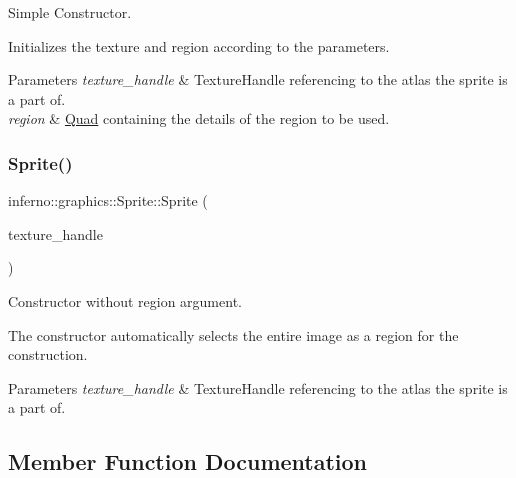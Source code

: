 Simple Constructor. 

Initializes the texture and region according to the parameters. 
\begin{DoxyParams}{Parameters}
{\em texture\+\_\+handle} & Texture\+Handle referencing to the atlas the sprite is a part of. \\
\hline
{\em region} & \mbox{\hyperlink{classinferno_1_1graphics_1_1_quad}{Quad}} containing the details of the region to be used. \\
\hline
\end{DoxyParams}
\mbox{\label{classinferno_1_1graphics_1_1_sprite_a8673ad1ca45d867e83355a1ad10b752a}} 
\subsubsection{\texorpdfstring{Sprite()}{Sprite()}\hspace{0.1cm}{\footnotesize\ttfamily [2/2]}}
{\footnotesize\ttfamily inferno\+::graphics\+::\+Sprite\+::\+Sprite (\begin{DoxyParamCaption}\item[{\mbox{\hyperlink{namespaceinferno_1_1graphics_a9d719bfbfedd17b9ace9b8d603ab5a38}{Texture\+Handle}}}]{texture\+\_\+handle }\end{DoxyParamCaption})\hspace{0.3cm}{\ttfamily [inline]}}



Constructor without region argument. 

The constructor automatically selects the entire image as a region for the construction. 
\begin{DoxyParams}{Parameters}
{\em texture\+\_\+handle} & Texture\+Handle referencing to the atlas the sprite is a part of. \\
\hline
\end{DoxyParams}


\subsection{Member Function Documentation}
\mbox{\label{classinferno_1_1graphics_1_1_sprite_a96641ce00e18f5f70a0b4972f1b50180}} 
